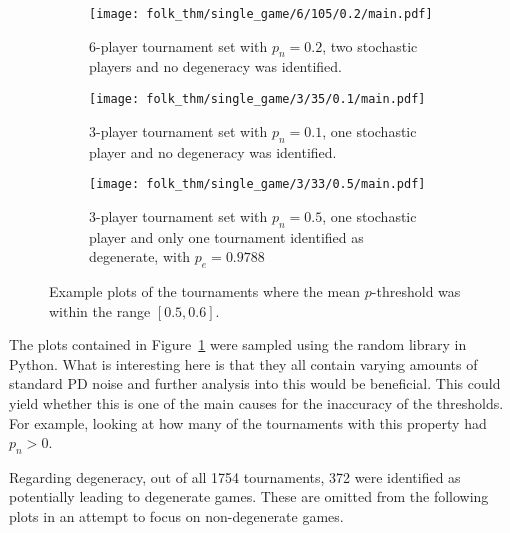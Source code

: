 \begin{figure}
    \centering
    \begin{subfigure}{0.45\textwidth}
        \centering
        \texttt{[image: folk\_thm/single\_game/6/105/0.2/main.pdf]}
        \caption{6-player tournament set with \(p_{n}=0.2\), two stochastic players and no degeneracy was identified.}
    \end{subfigure}
    \hspace{3pt}
    \begin{subfigure}{0.45\textwidth}
        \centering
        \texttt{[image: folk\_thm/single\_game/3/35/0.1/main.pdf]}
        \caption{3-player tournament set with \(p_{n}=0.1\), one stochastic player and no degeneracy was identified.}
    \end{subfigure}

    \vspace{5pt}

    \begin{subfigure}{0.45\textwidth}
        \centering
        \texttt{[image: folk\_thm/single\_game/3/33/0.5/main.pdf]}
        \caption{3-player tournament set with \(p_{n}=0.5\), one stochastic player and only one tournament identified as degenerate, with \(p_{e}=0.9788\)}
    \end{subfigure}
    \caption{Example plots of the tournaments where the mean \(p\)-threshold was within the range \([0.5, 0.6]\).}\label{fig:mean_middle_specific}
\end{figure}

The plots contained in Figure~\ref{fig:mean_middle_specific} were sampled using the random library in Python. What is interesting here is that
they all contain varying amounts of standard PD noise and further analysis into
this would be beneficial. This could yield whether this is one of the main causes for the
inaccuracy of the thresholds. For example, looking at how many of the
tournaments with this property had \(p_{n} > 0\).

Regarding degeneracy, out of all 1754 tournaments, 372 were identified as
potentially leading to degenerate games.
These are omitted from the following plots in an attempt to focus on
non-degenerate games.

